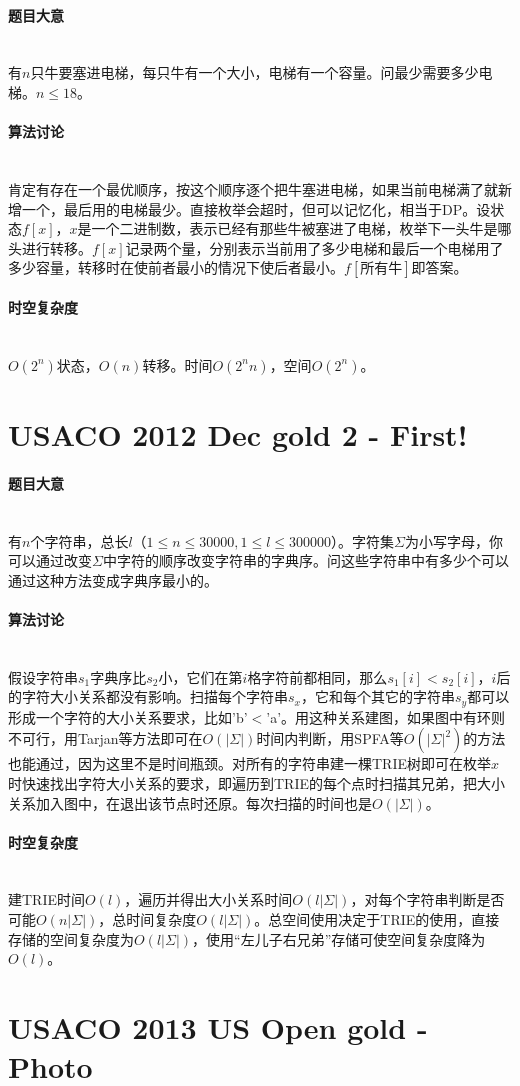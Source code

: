 \documentclass[UTF8]{ctexart}
\newcommand{\myparagraph}[1]{\paragraph{#1}\mbox{}\\}
\theoremstyle{nonumberplain}
\begin{document}
		\myparagraph{题目大意}
		
			有$n$只牛要塞进电梯，每只牛有一个大小，电梯有一个容量。问最少需要多少电梯。$n \leq 18$。
			
		\myparagraph{算法讨论}
		
			肯定有存在一个最优顺序，按这个顺序逐个把牛塞进电梯，如果当前电梯满了就新增一个，最后用的电梯最少。直接枚举会超时，但可以记忆化，相当于DP。设状态$f[x]$，$x$是一个二进制数，表示已经有那些牛被塞进了电梯，枚举下一头牛是哪头进行转移。$f[x]$记录两个量，分别表示当前用了多少电梯和最后一个电梯用了多少容量，转移时在使前者最小的情况下使后者最小。$f[\mbox{所有牛}]$即答案。
			
		\myparagraph{时空复杂度}
		
			$O(2^n)$状态，$O(n)$转移。时间$O(2^nn)$，空间$O(2^n)$。
	
	\section{USACO 2012 Dec gold 2 - First!}
		
		\myparagraph{题目大意}
		
			有$n$个字符串，总长$l$（$1 \leq n \leq 30000, 1 \leq l \leq 300000$）。字符集$\Sigma$为小写字母，你可以通过改变$\Sigma$中字符的顺序改变字符串的字典序。问这些字符串中有多少个可以通过这种方法变成字典序最小的。
		
		\myparagraph{算法讨论}
		
			假设字符串$s_1$字典序比$s_2$小，它们在第$i$格字符前都相同，那么$s_1[i]<s_2[i]$，$i$后的字符大小关系都没有影响。扫描每个字符串$s_x$，它和每个其它的字符串$s_y$都可以形成一个字符的大小关系要求，比如'b'$<$'a'。用这种关系建图，如果图中有环则不可行，用Tarjan等方法即可在$O(|\Sigma|)$时间内判断，用SPFA等$O(|\Sigma|^2)$的方法也能通过，因为这里不是时间瓶颈。对所有的字符串建一棵TRIE树即可在枚举$x$时快速找出字符大小关系的要求，即遍历到TRIE的每个点时扫描其兄弟，把大小关系加入图中，在退出该节点时还原。每次扫描的时间也是$O(|\Sigma|)$。
		
		\myparagraph{时空复杂度}
		
			建TRIE时间$O(l)$，遍历并得出大小关系时间$O(l|\Sigma|)$，对每个字符串判断是否可能$O(n|\Sigma|)$，总时间复杂度$O(l|\Sigma|)$。总空间使用决定于TRIE的使用，直接存储的空间复杂度为$O(l|\Sigma|)$，使用“左儿子右兄弟”存储可使空间复杂度降为$O(l)$。
	
	\section{USACO 2013 US Open gold - Photo}
	
\end{document}
